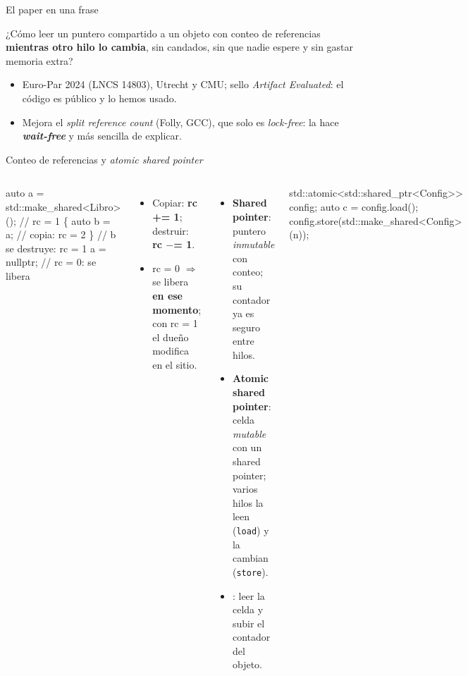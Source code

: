 \begin{frame}{El paper en una frase}
  \begin{block}{}
    \large ¿Cómo leer un puntero compartido a un objeto con conteo de referencias \textbf{mientras otro hilo lo cambia}, sin candados, sin que nadie espere y sin gastar memoria extra?
  \end{block}
  \bigskip
  \begin{itemize}
    \item Euro-Par 2024 (LNCS 14803), Utrecht y CMU; sello \emph{Artifact Evaluated}: el código es público y lo hemos usado.
    \item Mejora el \emph{split reference count} (Folly, GCC), que solo es \emph{lock-free}: la hace \textbf{\emph{wait-free}} y más sencilla de explicar.
  \end{itemize}
\end{frame}

\begin{frame}[fragile]{Conteo de referencias y \emph{atomic shared pointer}}
  \begin{columns}[T]
\begin{semiverbatim}\scriptsize
auto a = std::make_shared<Libro>(); // rc = 1
\{
    auto b = a;   // copia:          rc = 2
\}                 // b se destruye:  rc = 1
a = nullptr;      // rc = 0: se libera
\end{semiverbatim}
    \begin{itemize}\small
      \item Copiar: \textbf{rc += 1}; destruir: \textbf{rc $-$= 1}.
      \item rc = 0 $\Rightarrow$ se libera \textbf{en ese momento}; con rc = 1 el dueño modifica en el sitio.
    \end{itemize}
    \begin{itemize}\small
      \item \textbf{Shared pointer}: puntero \emph{inmutable} con conteo; su contador ya es seguro entre hilos.
      \item \textbf{Atomic shared pointer}: celda \emph{mutable} con un shared pointer; varios hilos la leen (\texttt{load}) y la cambian (\texttt{store}).
      \item {}: leer la celda y subir el contador del objeto.
    \end{itemize}
\begin{semiverbatim}\scriptsize
std::atomic<std::shared_ptr<Config>> config;
auto c = config.load();
config.store(std::make_shared<Config>(n));
\end{semiverbatim}
  \end{columns}
\end{frame}

